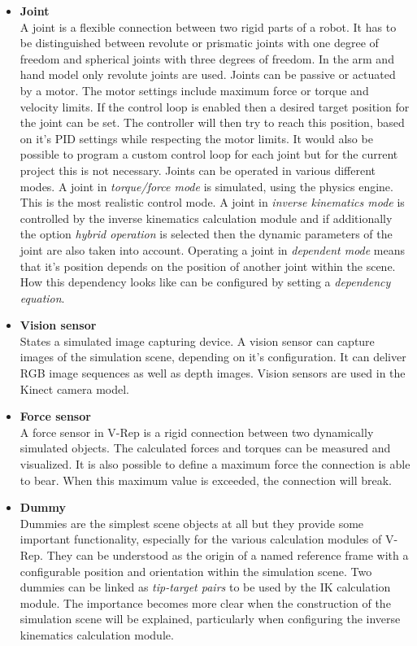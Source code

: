 \begin{itemize}
\item \textbf{Joint} \\
A joint is a flexible connection between two rigid parts of a robot. It has to be distinguished between revolute or prismatic joints with one degree of freedom and spherical joints with three degrees of freedom. In the arm and hand model only revolute joints are used. Joints can be passive or actuated by a motor. The motor settings include maximum force or torque and velocity limits. If the control loop is enabled then a desired target position for the joint can be set. The controller will then try to reach this position, based on it's PID settings while respecting the motor limits. It would also be possible to program a custom control loop for each joint but for the current project this is not necessary. Joints can be operated in various different modes. A joint in \emph{torque/force mode} is simulated, using the physics engine. This is the most realistic control mode. A joint in \emph{inverse kinematics mode} is controlled by the inverse kinematics calculation module and if additionally the option \emph{hybrid operation} is selected then the dynamic parameters of the joint are also taken into account. Operating a joint in \emph{dependent mode} means that it's position depends on the position of another joint within the scene. How this dependency looks like can be configured by setting a \emph{dependency equation}.

\item \textbf{Vision sensor} \\
States a simulated image capturing device. A vision sensor can capture images of the simulation scene, depending on it's configuration. It can deliver RGB image sequences as well as depth images. Vision sensors are used in the Kinect camera model.

\item \textbf{Force sensor} \\
A force sensor in V-Rep is a rigid connection between two dynamically simulated objects. The calculated forces and torques can be measured and visualized. It is also possible to define a maximum force the connection is able to bear. When this maximum value is exceeded, the connection will break.

\item \textbf{Dummy} \\
Dummies are the simplest scene objects at all but they provide some important functionality, especially for the various calculation modules of V-Rep. They can be understood as the origin of a named reference frame with a configurable position and orientation within the simulation scene. Two dummies can be linked as \emph{tip-target pairs} to be used by the IK calculation module. The importance becomes more clear when the construction of the simulation scene will be explained, particularly when configuring the inverse kinematics calculation module. 

\end{itemize}

